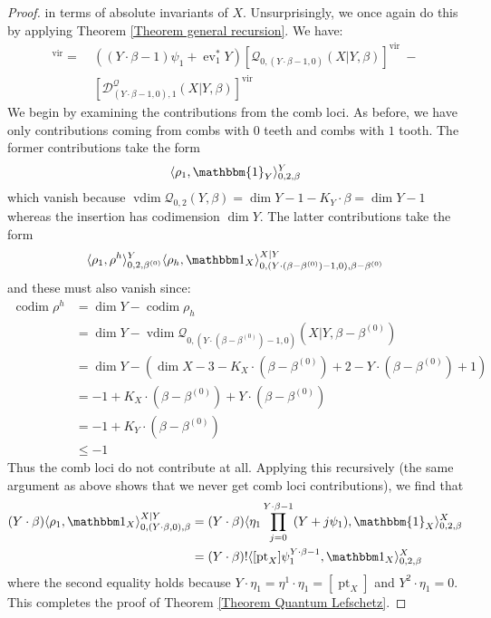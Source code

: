 \documentclass[11pt]{amsart}
\newcommand{\Q}[4]{\mathcal{Q}_{#1,#2}(#3,#4)}
\newcommand{\virt}[1]{[#1]^{\operatorname{vir}}}
\newcommand{\pt}{\operatorname{pt}}
\newcommand{\ev}{\operatorname{ev}}
\newcommand{\codim}{\operatorname{codim}}
\newcommand{\vdim}{\operatorname{vdim}}
\theoremstyle{definition}
\theoremstyle{definition}
\begin{document}
\begin{proof}
in terms of absolute invariants of $X$. Unsurprisingly, we once again do this by applying Theorem \ref{Theorem general recursion}. We have:
\begin{align*} \virt{\Q{0}{(Y \cdot \beta,0)}{X|Y}{\beta}} = \ & ((Y\cdot\beta-1)\psi_1+\ev_1^*Y) \virt{\Q{0}{(Y\cdot\beta-1,0)}{X|Y}{\beta}} \ - \\
& \virt{\mathcal{D}_{(Y\cdot\beta-1,0),1}^{\mathcal Q}(X|Y,\beta)} \end{align*}
We begin by examining the contributions from the comb loci. As before, we have only contributions coming from combs with $0$ teeth and combs with $1$ tooth. The former contributions take the form
\begin{equation*} \langle \rho_1 , \mathbbm{1}_Y \rangle_{0,2,\beta}^Y \end{equation*}
which vanish because $\vdim{\Q{0}{2}{Y}{\beta}} = \dim Y -1 -K_Y\cdot\beta = \dim Y -1$ whereas the insertion has codimension $\dim Y$. The latter contributions take the form
\begin{equation*} \langle \rho_1 ,\rho^h\rangle_{0,2,\beta^{(0)}}^Y \langle \rho_h,\mathbbm 1_{X}\rangle_{0,(Y\cdot(\beta-\beta^{(0)})-1,0),\beta-\beta^{(0)}}^{X|Y}\end{equation*}
and these must also vanish since:
\begin{align*} \codim \rho^h & = \dim Y - \codim \rho_h \\
& = \dim Y - \vdim \Q{0}{(Y\cdot(\beta-\beta^{(0)})-1,0)}{X|Y}{\beta-\beta^{(0)}} \\
& = \dim Y - (\dim X - 3 - K_X \cdot (\beta - \beta^{(0)}) + 2 - Y \cdot (\beta - \beta^{(0)}) + 1) \\
&= -1 + K_X \cdot (\beta-\beta^{(0)}) + Y \cdot (\beta-\beta^{(0)}) \\
& = -1 + K_Y\cdot(\beta-\beta^{(0)}) \\
& \leq -1
\end{align*}
Thus the comb loci do not contribute at all. Applying this recursively (the same argument as above shows that we never get comb loci contributions), we find that
\begin{align*}
(Y\cdot\beta)\langle \rho_1 ,\mathbbm 1_{X}\rangle_{0,(Y\cdot\beta,0),\beta}^{X|Y} & = (Y\cdot\beta) \langle \eta_1 \prod_{j=0}^{Y\cdot\beta-1}(Y+j\psi_1) , \mathbbm{1}_X \rangle_{0,2,\beta}^X \\
& = (Y\cdot\beta)!\langle[ \pt_X]\psi_1^{Y\cdot\beta-1},\mathbbm 1_X\rangle_{0,2,\beta}^X
\end{align*}
where the second equality holds because $Y\cdot\eta_1=\eta^1 \cdot \eta_1 = [\pt_X]$ and $Y^2\cdot\eta_1=0$. This completes the proof of Theorem \ref{Theorem Quantum Lefschetz}. \end{proof}
\end{document}
